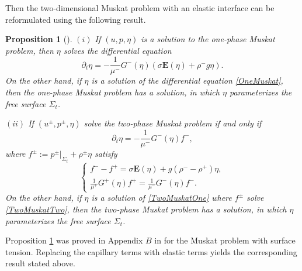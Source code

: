 \documentclass[12pt]{amsart}
\newtheorem{proposition}[theorem]{Proposition}
\theoremstyle{definition}
\numberwithin{equation}{section}
\newcommand{\p}{\partial}
\begin{document}
Then the two-dimensional Muskat problem with an elastic interface can be reformulated using the following result.

\begin{proposition}[\hspace{1sp}\cite{MR4131404}] \label{t:Formuation}
$(i)$ If $(u,p, \eta)$ is a solution to the one-phase Muskat problem, then $\eta$ solves the differential equation
\begin{equation} \label{OneMuskat}
    \p_t \eta = -\frac{1}{\mu^-}G^-(\eta)(\sigma \mathbf{E}(\eta)+ \rho^- g \eta).
\end{equation}
On the other hand, if $\eta$ is a solution of the differential equation \eqref{OneMuskat}, then the one-phase Muskat problem has a solution, in which $\eta$ parameterizes the free surface $\Sigma_t$.

$(ii)$ If $(u^\pm, p^\pm, \eta)$ solve the two-phase Muskat problem if and only if
\begin{equation} \label{TwoMuskatOne}
    \p_t \eta = -\frac{1}{\mu^-}G^-(\eta)f^-,
\end{equation}
where $f^\pm := p^\pm|_{\Sigma_t} + \rho^\pm \eta$ satisfy 
\begin{equation}  \label{TwoMuskatTwo}
\begin{cases}
f^- - f^+ = \sigma \mathbf{E}(\eta) + g(\rho^- - \rho^+)\eta, \\
\frac{1}{\mu^+}G^+(\eta)f^+ = \frac{1}{\mu^-}G^-(\eta)f^-.
\end{cases}
\end{equation}
On the other hand, if $\eta$ is a solution of \eqref{TwoMuskatOne} where $f^\pm$ solve \eqref{TwoMuskatTwo}, then the two-phase Muskat problem has a solution, in which $\eta$ parameterizes the free surface $\Sigma_t$.
\end{proposition}

Proposition \ref{t:Formuation} was proved in Appendix $B$ in \cite{MR4131404} for the Muskat problem with surface tension.
Replacing the capillary terms with elastic terms yields the corresponding result stated above.
\end{document}
